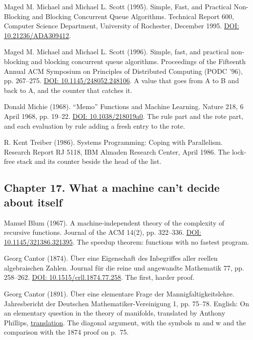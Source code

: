 \noindent Maged M. Michael and Michael L. Scott (1995). Simple, Fast, and Practical Non-Blocking and Blocking Concurrent Queue Algorithms. Technical Report 600, Computer Science Department, University of Rochester, December 1995. \href{https://doi.org/10.21236/ADA309412}{DOI: 10.21236/ADA309412}.
\par\medskip

\noindent Maged M. Michael and Michael L. Scott (1996). Simple, fast, and practical non-blocking and blocking concurrent queue algorithms. Proceedings of the Fifteenth Annual ACM Symposium on Principles of Distributed Computing (PODC '96), pp. 267--275. \href{https://doi.org/10.1145/248052.248106}{DOI: 10.1145/248052.248106}. A value that goes from A to B and back to A, and the counter that catches it.
\par\medskip

\noindent Donald Michie (1968). ``Memo'' Functions and Machine Learning. Nature 218, 6 April 1968, pp. 19--22. \href{https://doi.org/10.1038/218019a0}{DOI: 10.1038/218019a0}. The rule part and the rote part, and each evaluation by rule adding a fresh entry to the rote.
\par\medskip

\noindent R. Kent Treiber (1986). Systems Programming: Coping with Parallelism. Research Report RJ 5118, IBM Almaden Research Center, April 1986. The lock-free stack and its counter beside the head of the list.
\par\medskip

\subsection*{Chapter 17. What a machine can't decide about itself}

\noindent Manuel Blum (1967). A machine-independent theory of the complexity of recursive functions. Journal of the ACM 14(2), pp. 322--336. \href{https://doi.org/10.1145/321386.321395}{DOI: 10.1145/321386.321395}. The speedup theorem: functions with no fastest program.
\par\medskip

\noindent Georg Cantor (1874). \"Uber eine Eigenschaft des Inbegriffes aller reellen algebraischen Zahlen. Journal f\"ur die reine und angewandte Mathematik 77, pp. 258--262. \href{https://doi.org/10.1515/crll.1874.77.258}{DOI: 10.1515/crll.1874.77.258}. The first, harder proof.
\par\medskip

\noindent Georg Cantor (1891). \"Uber eine elementare Frage der Mannigfaltigkeitslehre. Jahresbericht der Deutschen Mathematiker-Vereinigung 1, pp. 75--78. English: On an elementary question in the theory of manifolds, translated by Anthony Phillips, \href{https://math.stonybrook.edu/~tony/archive/336f06/cantor/cantor.html}{translation}. The diagonal argument, with the symbols m and w and the comparison with the 1874 proof on p.~75.
\par\medskip

